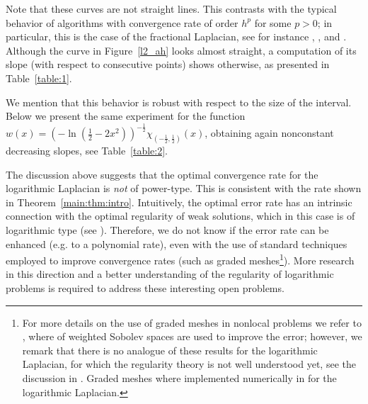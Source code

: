 \documentclass[11 pt]{article}
\numberwithin{equation}{section}
\begin{document}
Note that these curves are not straight lines. This contrasts with the typical behavior of algorithms with convergence rate of order $h^p$ for some $p>0$; in particular, this is the case of the fractional Laplacian, see for instance \cite[Figure 8]{BH17}, \cite[Figure 1]{AB17}, and \cite[Table 3]{HSJSS23}. Although the curve in Figure~\ref{l2_ah} looks almost straight, a computation of its slope (with respect to consecutive points) shows otherwise, as presented in Table~\ref{table:1}.

We mention that this behavior is robust with respect to the size of the interval.  Below we present the same experiment for the function 
$w(x)=\left(
-\ln\left(\frac{1}{2}-2x^2\right)\right)^{-\frac{1}{2}} \chi_{(-\frac{1}{2},\frac{1}{2})}(x)$, obtaining again nonconstant decreasing slopes, see Table~\ref{table:2}.

The discussion above suggests that the optimal convergence rate for the logarithmic Laplacian is \emph{not} of power-type. This is consistent with the rate shown in Theorem~\ref{main:thm:intro}. Intuitively, the optimal error rate has an intrinsic connection with the optimal regularity of weak solutions, which in this case is of logarithmic type (see \cite[Theorem 1.2]{HSLRS23}). Therefore, we do not know if the error rate can be enhanced (e.g. to a polynomial rate), even with the use of standard techniques employed to improve convergence rates (such as graded meshes\footnote{For more details on the use of graded meshes in nonlocal problems we refer to \cite[Section 3.4]{Bor17}, where  of weighted Sobolev spaces are used to improve the error; however, we remark that there is no analogue of these results for the logarithmic Laplacian, for which the regularity theory is not well understood yet, see the discussion in \cite[Section 2]{CS22}.  Graded meshes where implemented numerically in \cite{L22} for the logarithmic Laplacian.}). More research in this direction and a better understanding of the regularity of logarithmic problems is required to address these interesting open problems.
\end{document}
